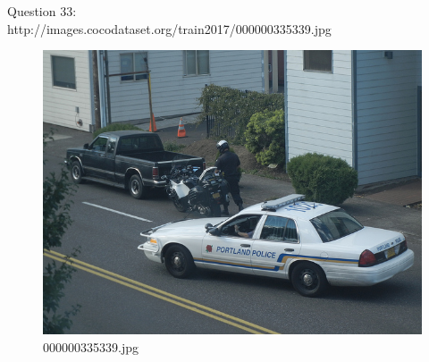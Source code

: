     Question 33:\\http://images.cocodataset.org/train2017/000000335339.jpg
    \begin{figure}[h]
        \centering
        \includegraphics[width=0.8\linewidth]{../image set/easy/000000335339.jpg}
        \caption{000000335339.jpg}
    \end{figure} 
